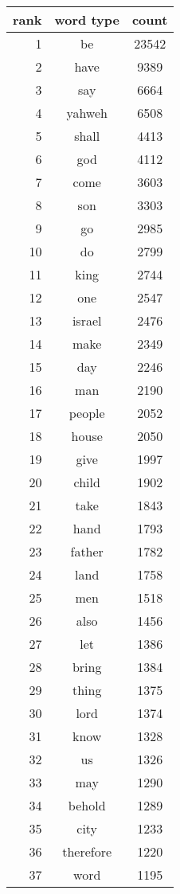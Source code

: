 
\begin{figure*}
  \begin{tiny}
  \begin{centering}
  \begin{tabular}{|r|c|c|}
    \hline
    rank & word type & count \\
    \hline
1 & be & 23542 \\
2 & have & 9389 \\
3 & say & 6664 \\
4 & yahweh & 6508 \\
5 & shall & 4413 \\
6 & god & 4112 \\
7 & come & 3603 \\
8 & son & 3303 \\
9 & go & 2985 \\
10 & do & 2799 \\
11 & king & 2744 \\
12 & one & 2547 \\
13 & israel & 2476 \\
14 & make & 2349 \\
15 & day & 2246 \\
16 & man & 2190 \\
17 & people & 2052 \\
18 & house & 2050 \\
19 & give & 1997 \\
20 & child & 1902 \\
21 & take & 1843 \\
22 & hand & 1793 \\
23 & father & 1782 \\
24 & land & 1758 \\
25 & men & 1518 \\
26 & also & 1456 \\
27 & let & 1386 \\
28 & bring & 1384 \\
29 & thing & 1375 \\
30 & lord & 1374 \\
31 & know & 1328 \\
32 & us & 1326 \\
33 & may & 1290 \\
34 & behold & 1289 \\
35 & city & 1233 \\
36 & therefore & 1220 \\
37 & word & 1195 \\

\end{tabular}
\end{centering}
\end{tiny}
\end{figure*}
